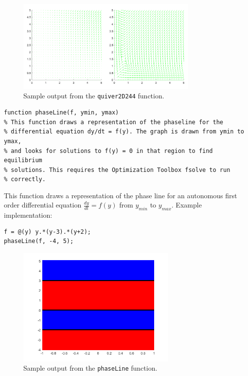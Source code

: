 \documentclass{ximera}
\begin{document}
\begin{figure}[h!]
    \centering
    \includegraphics[width=0.8\textwidth]{figures/MatlabDemo_quiv2D.png}
    \caption{Sample output from the \texttt{quiver2D244} function.}
    \label{fig:MatlabDemo_Quiv2d}
\end{figure}

\begin{verbatim}
function phaseLine(f, ymin, ymax)
% This function draws a representation of the phaseline for the
% differential equation dy/dt = f(y). The graph is drawn from ymin to ymax,
% and looks for solutions to f(y) = 0 in that region to find equilibrium
% solutions. This requires the Optimization Toolbox fsolve to run
% correctly.
\end{verbatim}

This function draws a representation of the phase line for an autonomous first order differential equation $\frac{dy}{dt} = f(y)$ from $y_{min}$ to $y_{max}$. Example implementation:
\begin{verbatim}
f = @(y) y.*(y-3).*(y+2);
phaseLine(f, -4, 5);
\end{verbatim}

\begin{figure}[h!]
    \centering
    \includegraphics[width=0.7\textwidth]{figures/MatlabDemo_phaseLine.png}
    \caption{Sample output from the \texttt{phaseLine} function.}
    \label{fig:MatlabDemo_phaseLine}
\end{figure}
\end{document}
